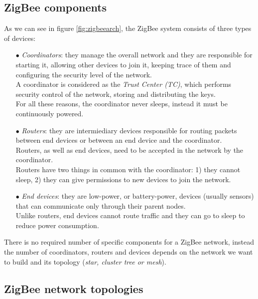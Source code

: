 \documentclass[12pt]{report}
\begin{document}
{{\bigskip
\subsection{ZigBee components}
\bigskip

As we can see in figure \ref{fig:zigbeearch}, the ZigBee system consists of three types of devices:

\begin{itemize}
\setlength{\itemindent}{+4mm}
\item[$\bullet$] \emph{Coordinators}: they manage the overall network and they are responsible for starting it, allowing other devices to join it, keeping trace of them and configuring the security level of the network.\\
A coordinator is considered as the \emph{Trust Center (TC)}, which performs security control of the network, storing and distributing the  keys.\\
For all these reasons, the coordinator never sleeps, instead it must be continuously powered.


\item[$\bullet$] \emph{Routers}: they are intermiediary devices responsible for routing packets between end devices or between an end device and the coordinator.\\
Routers, as well as end devices, need to be accepted in the network by the coordinator.\\
Routers have two things in common with the coordinator: 1) they cannot sleep, 2) they can give permissions to new devices to join the network.

\item[$\bullet$] \emph{End devices}: they are low-power, or battery-power, devices (usually sensors) that can communicate only through their parent nodes.\\
Unlike routers, end devices cannot route traffic and they can go to sleep to reduce power consumption.
\end{itemize}

There is no required number of specific components for a ZigBee network, instead the number of coordinators, routers and devices depends on the network we want to build and its topology (\emph{star, cluster tree or mesh}).

\subsection{ZigBee network topologies}

}}
\end{document}
